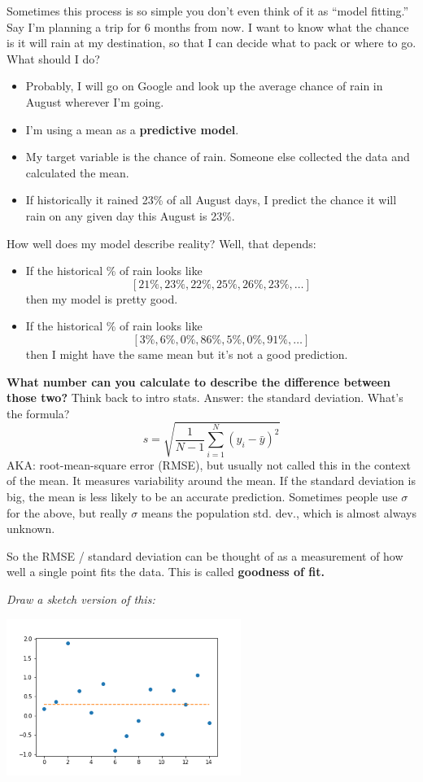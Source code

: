 \documentclass{article}
\begin{document}
Sometimes this process is so simple you don't even think of it as ``model fitting.'' Say I'm planning a trip for 6 months from now. I want to know what the chance is it will rain at my destination, so that I can decide what to pack or where to go. What should I do?
\begin{itemize}
    \item Probably, I will go on Google and look up the average chance of rain in August wherever I'm going.
    \item I'm using a mean as a \textbf{predictive model}.
    \item My target variable is the chance of rain. Someone else collected the data and calculated the mean.
    \item If historically it rained 23\% of all August days, I predict the chance it will rain on any given day this August is 23\%.
\end{itemize}
How well does my model describe reality? Well, that depends:
\begin{itemize}
    \item If the historical \% of rain looks like
    \[
    [21\%, 23\%, 22\%, 25\%, 26\%, 23\%, \ldots]
    \]
    then my model is pretty good.
    \item If the historical \% of rain looks like
    \[
    [3\%, 6\%, 0\%, 86\%, 5\%, 0\%, 91\%, \ldots]
    \]
    then I might have the same mean but it's not a good prediction.
\end{itemize}

\textbf{What number can you calculate to describe the difference between those two?} Think back to intro stats. Answer: the standard deviation. What's the formula?
\[
    s = \sqrt{\frac{1}{N-1} \sum_{i=1}^N (y_i - \bar y)^2}
\]
AKA: root-mean-square error (RMSE), but usually not called this in the context of the mean. It measures variability around the mean. If the standard deviation is big, the mean is less likely to be an accurate prediction. Sometimes people use $\sigma$ for the above, but really $\sigma$ means the population std. dev., which is almost always unknown.

So the RMSE / standard deviation can be thought of as a measurement of how well a single point fits the data. This is called \textbf{goodness of fit.}

\textit{Draw a sketch version of this:}

\begin{center}
\includegraphics[width=3in]{meanplot.png}
\end{center}
\end{document}
